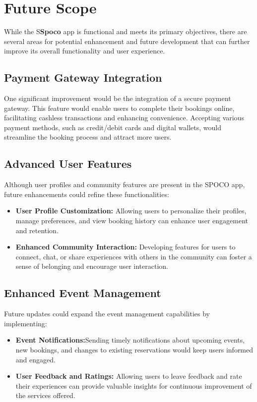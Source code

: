 \documentclass[12pt,a4paper]{report}
\begin{document}
\section{Future Scope}
While the S\textbf{Spoco} app is functional and meets its primary objectives, there are several areas for potential enhancement and future development that can further improve its overall functionality and user experience.

\subsection{Payment Gateway Integration}
One significant improvement would be the integration of a secure payment gateway. This feature would enable users to complete their bookings online, facilitating cashless transactions and enhancing convenience. Accepting various payment methods, such as credit/debit cards and digital wallets, would streamline the booking process and attract more users.

\subsection{Advanced User Features}
Although user profiles and community features are present in the SPOCO app, future enhancements could refine these functionalities:
\begin{itemize}
    \item \textbf{User Profile Customization:} Allowing users to personalize their profiles, manage preferences, and view booking history can enhance user engagement and retention.
    \item \textbf{Enhanced Community Interaction: } Developing features for users to connect, chat, or share experiences with others in the community can foster a sense of belonging and encourage user interaction.
\end{itemize}


\subsection{Enhanced Event Management}
Future updates could expand the event management capabilities by implementing:
\begin{itemize}
    \item \textbf{Event Notifications:}Sending timely notifications about upcoming events, new bookings, and changes to existing reservations would keep users informed and engaged.
    \item \textbf{User Feedback and Ratings: } Allowing users to leave feedback and rate their experiences can provide valuable insights for continuous improvement of the services offered.
\end{itemize}
\end{document}

